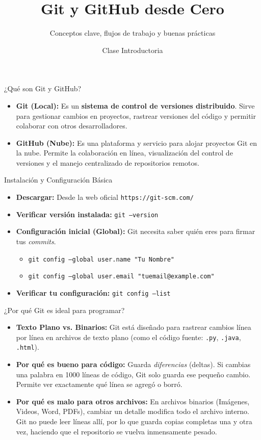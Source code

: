 \documentclass[11pt, aspectratio=169]{beamer}
\title{Git y GitHub desde Cero}
\subtitle{Conceptos clave, flujos de trabajo y buenas prácticas}
\author{Clase Introductoria}
\date{}
\begin{document}
\begin{frame}
    \titlepage
\end{frame}

\begin{frame}{¿Qué son Git y GitHub?}
    \begin{itemize}
        \item \textbf{Git (Local):} Es un \textbf{sistema de control de versiones distribuido}. Sirve para gestionar cambios en proyectos, rastrear versiones del código y permitir colaborar con otros desarrolladores.
        \item \textbf{GitHub (Nube):} Es una plataforma y servicio para alojar proyectos Git en la nube. Permite la colaboración en línea, visualización del control de versiones y el manejo centralizado de repositorios remotos.
    \end{itemize}
\end{frame}

\begin{frame}{Instalación y Configuración Básica}
    \begin{itemize}
        \item \textbf{Descargar:} Desde la web oficial \texttt{https://git-scm.com/}
        \item \textbf{Verificar versión instalada:} \texttt{git --version}
        \item \textbf{Configuración inicial (Global):} Git necesita saber quién eres para firmar tus \textit{commits}.
        \begin{itemize}
            \item \texttt{git config --global user.name "Tu Nombre"}
            \item \texttt{git config --global user.email "tuemail@example.com"}
        \end{itemize}
        \item \textbf{Verificar tu configuración:} \texttt{git config --list}
    \end{itemize}
\end{frame}

\begin{frame}{¿Por qué Git es ideal para programar?}
    \begin{itemize}
        \item \textbf{Texto Plano vs. Binarios:} Git está diseñado para rastrear cambios línea por línea en archivos de texto plano (como el código fuente: \texttt{.py}, \texttt{.java}, \texttt{.html}).
        \item \textbf{Por qué es bueno para código:} Guarda \textit{diferencias} (deltas). Si cambias una palabra en 1000 líneas de código, Git solo guarda ese pequeño cambio. Permite ver exactamente qué línea se agregó o borró.
        \item \textbf{Por qué es malo para otros archivos:} En archivos binarios (Imágenes, Videos, Word, PDFs), cambiar un detalle modifica todo el archivo interno. Git no puede leer líneas allí, por lo que guarda copias completas una y otra vez, haciendo que el repositorio se vuelva inmensamente pesado.
    \end{itemize}
\end{frame}
\end{document}

